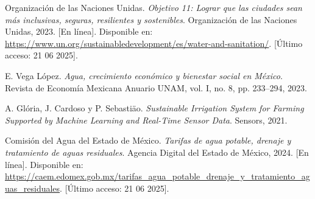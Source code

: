 \documentclass[pdflatex,sn-mathphys-num]{sn-jnl}%
\theoremstyle{thmstyleone}%
\theoremstyle{thmstyletwo}%
\theoremstyle{thmstylethree}%
\begin{document}

\begin{thebibliography}{4}


Organización de las Naciones Unidas.
\textit{Objetivo 11: Lograr que las ciudades sean más inclusivas, seguras, resilientes y sostenibles}.
Organización de las Naciones Unidas, 2023.
[En línea]. Disponible en: \url{https://www.un.org/sustainabledevelopment/es/water-and-sanitation/}.
[Último acceso: 21 06 2025].

E. Vega López.
\textit{Agua, crecimiento económico y bienestar social en México}.
Revista de Economía Mexicana Anuario UNAM, vol. I, no. 8, pp. 233–294, 2023.

A. Glória, J. Cardoso y P. Sebastiäo.
\textit{Sustainable Irrigation System for Farming Supported by Machine Learning and Real-Time Sensor Data}.
Sensors, 2021.

Comisión del Agua del Estado de México.
\textit{Tarifas de agua potable, drenaje y tratamiento de aguas residuales}.
Agencia Digital del Estado de México, 2024.
[En línea]. Disponible en: \url{https://caem.edomex.gob.mx/tarifas_agua_potable_drenaje_y_tratamiento_aguas_residuales}.
[Último acceso: 21 06 2025].




\end{thebibliography}
\end{document}
